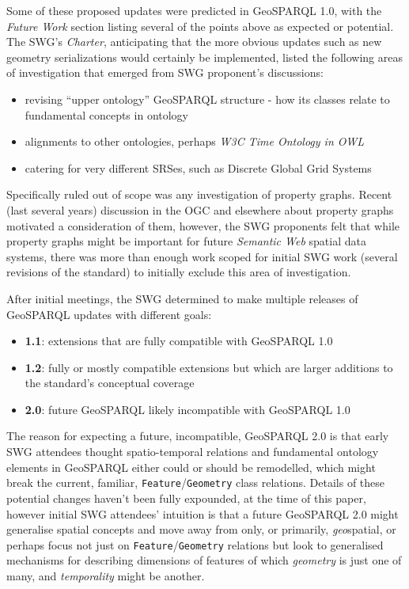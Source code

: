 \documentclass[runningheads]{llncs}
\begin{document}
Some of these proposed updates were predicted in GeoSPARQL 1.0, with the \textit{Future Work} section listing several of the 
points above as expected or potential.
The SWG's \textit{Charter}, anticipating that the more obvious updates such as new geometry serializations would certainly
be implemented, listed the following areas of investigation that emerged from SWG proponent's discussions:

\begin{itemize}
    \item revising ``upper ontology'' GeoSPARQL structure - how its classes relate to fundamental concepts in ontology
    \item alignments to other ontologies, perhaps \textit{W3C Time Ontology in OWL}~\cite{simon_cox_time_2017}
    \item catering for very different SRSes, such as Discrete Global Grid Systems
\end{itemize}

Specifically ruled out of scope was any investigation of property graphs. Recent (last several years) discussion in the OGC and 
elsewhere about property graphs motivated a consideration of them, however, the SWG proponents felt that while property graphs might 
be important for future \textit{Semantic Web} spatial data systems, there was more than enough work scoped for initial SWG work
(several revisions of the standard) to initially exclude this area of investigation.

After initial meetings, the SWG determined to make multiple releases of GeoSPARQL updates with different goals:

\begin{itemize}
    \item \textbf{1.1}: extensions that are fully compatible with GeoSPARQL 1.0
    \item \textbf{1.2}: fully or mostly compatible extensions but which are larger additions to the standard's conceptual coverage
    \item \textbf{2.0}: future GeoSPARQL likely incompatible with GeoSPARQL 1.0
\end{itemize} 

The reason for expecting a future, incompatible, GeoSPARQL 2.0 is that early SWG attendees thought spatio-temporal relations
and fundamental ontology elements in GeoSPARQL either could or should be remodelled, which might break the current, familiar, 
\texttt{Feature}/\texttt{Geometry} class relations. Details of these potential changes haven't been fully expounded, at the 
time of this paper, however initial SWG attendees' intuition is that a future GeoSPARQL 2.0 might generalise spatial concepts and
move away from only, or primarily, \textit{geo}spatial, or perhaps focus not just on \texttt{Feature}/\texttt{Geometry} relations
but look to generalised mechanisms for describing dimensions of features of which \textit{geometry} is just one of many, and 
\textit{temporality} might be another.
\end{document}
